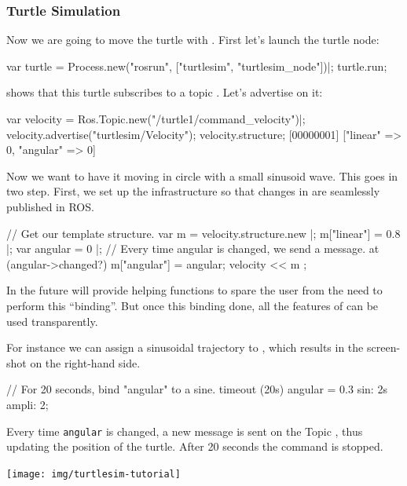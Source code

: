 \subsubsection{Turtle Simulation}
\label{sec:turtlesim}

Now we are going to move the turtle with \urbi. First let's launch the
turtle node:

\begin{urbiunchecked}
var turtle = Process.new("rosrun", ["turtlesim", "turtlesim_node"])|;
turtle.run;
\end{urbiunchecked}

 shows that this turtle subscribes to a topic
. Let's advertise on it:

\begin{urbiunchecked}
var velocity = Ros.Topic.new("/turtle1/command_velocity")|;
velocity.advertise("turtlesim/Velocity");
velocity.structure;
[00000001] ["linear" => 0, "angular" => 0]
\end{urbiunchecked}


Now we want to have it moving in circle with a small sinusoid wave.  This
goes in two step.  First, we set up the infrastructure so that changes in
\urbi are seamlessly published in ROS.

\begin{urbiunchecked}
// Get our template structure.
var m = velocity.structure.new |;
m["linear"] = 0.8 |;
var angular = 0 |;
// Every time angular is changed, we send a message.
at (angular->changed?)
{
  m["angular"] = angular;
  velocity << m
};
\end{urbiunchecked}

\noindent
In the future \urbi will provide helping functions to spare the user from
the need to perform this ``binding''.  But once this binding done, all the
features of \us can be used transparently.

\begin{multicols}{2}
  For instance we can assign a sinusoidal trajectory to ,
  which results in the screen-shot on the right-hand side.

\begin{urbiunchecked}[xrightmargin=0cm,xleftmargin=0cm]
// For 20 seconds, bind "angular" to a sine.
timeout (20s)
  angular = 0.3 sin: 2s ampli: 2;
\end{urbiunchecked}

Every time \lstinline{angular} is changed, a new message is sent on the
Topic , thus updating the position of the
turtle.  After 20 seconds the command is stopped.

\columnbreak

\begin{center}
  \texttt{[image: img/turtlesim-tutorial]}
\end{center}

\end{multicols}

